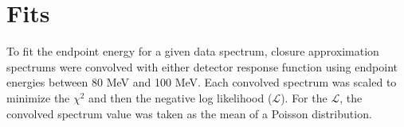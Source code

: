 
\section { Fits }

To fit the endpoint energy for a given data spectrum, closure approximation spectrums were convolved with either detector
response function using endpoint energies between 80 MeV and 100 MeV.
Each convolved spectrum was scaled to minimize the $\chi^2$ and then the negative log likelihood ($\mathcal{L}$).
For the $\mathcal{L}$, the convolved spectrum value was taken as the mean of
a Poisson distribution.



